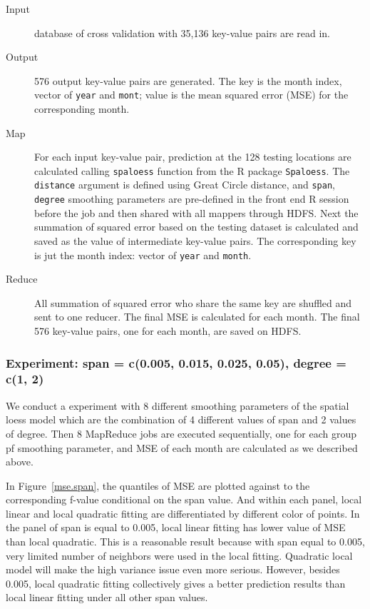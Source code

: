 \begin{description}
  \item[Input] database of cross validation with 35,136 key-value pairs are read 
  in.
  \item[Output] 576 output key-value pairs are generated. The key is the month
  index, vector of \texttt{year} and \texttt{mont}; value is the mean squared
  error (MSE) for the corresponding month.
  \item[Map] For each input key-value pair, prediction at the 128 testing locations
  are calculated calling \texttt{spaloess} function from the R package 
  \texttt{Spaloess}. The \texttt{distance} argument is defined using Great Circle
  distance, and \texttt{span}, \texttt{degree} smoothing parameters are 
  pre-defined in the front end R session before the job and then shared with all
  mappers through HDFS. Next the summation of squared error based on the testing 
  dataset is calculated and saved as the value of intermediate key-value pairs. 
  The corresponding key is jut the month index: vector of \texttt{year} and 
  \texttt{month}.
  \item[Reduce] All summation of squared error who share the same key are shuffled 
  and sent to one reducer. The final MSE is calculated for each month. The final 
  576 key-value pairs, one for each month, are saved on HDFS.
\end{description}

\subsubsection{Experiment: span = c(0.005, 0.015, 0.025, 0.05), degree = c(1, 2)}

We conduct a experiment with 8 different smoothing parameters of the spatial loess
model which are the combination of 4 different values of span and 2 values of
degree. Then 8 MapReduce jobs are executed sequentially, one for each group pf 
smoothing parameter, and MSE of each month are calculated as we described above.

In Figure~\href{../plots/a1950/spafit/QuanMABSE.a1950.tmax.span.pdf}
{\ref*{mse.span}}, the quantiles of MSE are plotted against to the corresponding
f-value conditional on the span value. And within each panel, local linear and 
local quadratic fitting are differentiated by different color of points. In the 
panel of span is equal to 0.005, local linear fitting has lower value of MSE 
than local quadratic. This is a reasonable result because with span equal to 
0.005, very limited number of neighbors were used in the local fitting. Quadratic
local model will make the high variance issue even more serious. However, besides 
0.005, local quadratic fitting collectively gives a better prediction results 
than local linear fitting under all other span values.

